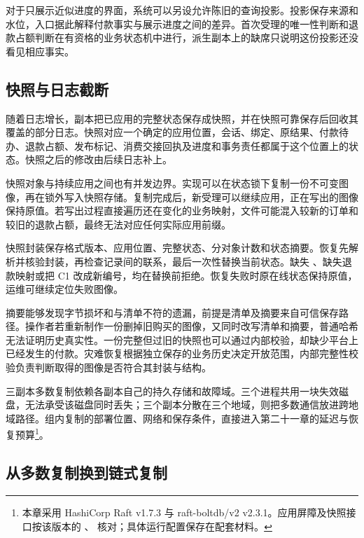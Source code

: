 
对于只展示近似进度的界面，系统可以另设允许陈旧的查询投影。投影保存来源和水位，入口据此解释付款事实与展示进度之间的差异。首次受理的唯一性判断和退款占额判断在有资格的业务状态机中进行，派生副本上的缺席只说明这份投影还没看见相应事实。

\subsection*{快照与日志截断}

随着日志增长，副本把已应用的完整状态保存成快照，并在快照可靠保存后回收其覆盖的部分日志。快照对应一个确定的应用位置，会话、绑定、原结果、付款待办、退款占额、发布标记、消费交接回执及进度和事务责任都属于这个位置上的状态。快照之后的修改由后续日志补上。

快照对象与持续应用之间也有并发边界。实现可以在状态锁下复制一份不可变图像，再在锁外写入快照存储。复制完成后，新受理可以继续应用，正在写出的图像保持原值。若写出过程直接遍历还在变化的业务映射，文件可能混入较新的订单和较旧的退款占额，最终无法对应任何实际应用前缀。


快照封装保存格式版本、应用位置、完整状态、分对象计数和状态摘要。恢复先解析并核验封装，再检查记录间的联系，最后一次性替换当前状态。缺失 、缺失退款映射或把 C1 改成新编号，均在替换前拒绝。恢复失败时原在线状态保持原值，运维可继续定位失败图像。

摘要能够发现字节损坏和与清单不符的遗漏，前提是清单及摘要来自可信保存路径。操作者若重新制作一份删掉旧购买的图像，又同时改写清单和摘要，普通哈希无法证明历史真实性。一份完整但过旧的快照也可以通过内部校验，却缺少平台上已经发生的付款。灾难恢复根据独立保存的业务历史决定开放范围，内部完整性校验负责判断取得的图像是否符合其封装与结构。

三副本多数复制依赖各副本自己的持久存储和故障域。三个进程共用一块失效磁盘，无法承受该磁盘同时丢失；三个副本分散在三个地域，则把多数通信放进跨地域路径。组内复制的部署位置、网络和保存条件，直接进入第二十一章的延迟与恢复预算\footnote{本章采用 HashiCorp Raft v1.7.3 与 raft-boltdb/v2 v2.3.1。应用屏障及快照接口按该版本的 、 核对；具体运行配置保存在配套材料。}。

\subsection*{从多数复制换到链式复制}

